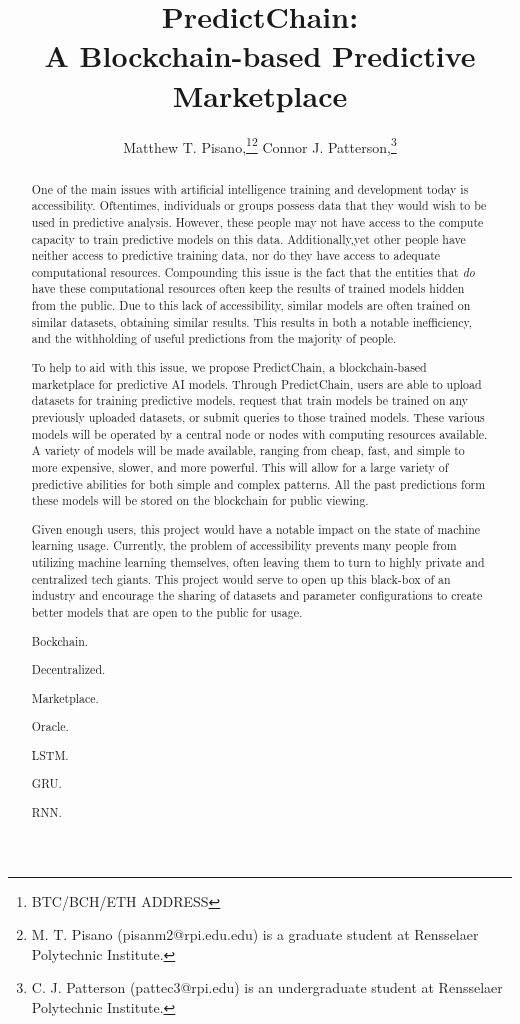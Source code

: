 \documentclass{ledger}
\title{PredictChain:\\
A Blockchain-based Predictive Marketplace}
\author{
    Matthew T. Pisano,\thanks{BTC/BCH/ETH ADDRESS}\thanks{M. T. Pisano (pisanm2@rpi.edu.edu) is a graduate
    student at Rensselaer Polytechnic Institute.} 
    Connor J. Patterson,\thanks{C. J. Patterson (pattec3@rpi.edu) is an undergraduate student at
    Rensselaer Polytechnic Institute.}
}
\begin{document}
\maketitle

\thispagestyle{pagefirst}

\begin{abstract}
One of the main issues with artificial intelligence training and development today is accessibility. Oftentimes,
individuals or groups possess data that they would wish to be used in predictive analysis. However, these people
may not have access to the compute capacity to train predictive models on this data.  Additionally,yet other
people have neither access to predictive training data, nor do they have access to adequate computational resources.
Compounding this issue is the fact that the entities that \textit{do} have these computational resources often keep the results of
trained models hidden from the public.  Due to this lack of accessibility, similar models are often trained on similar datasets,
obtaining similar results.  This results in both a notable inefficiency, and the withholding of useful predictions from
the majority of people.

To help to aid with this issue, we propose PredictChain, a blockchain-based marketplace for predictive AI models.
Through PredictChain, users are able to upload datasets for training predictive models, request that train models
be trained on any previously uploaded datasets, or submit queries to those trained models.
These various models will be operated by a central node or nodes with computing resources available. A variety of
models will be made available, ranging from cheap, fast, and simple to more expensive, slower, and more powerful.
This will allow for a large variety of predictive abilities for both simple and complex patterns.  All the past predictions
form these models will be stored on the blockchain for public viewing.

Given enough users, this project would have a notable impact on the state of machine learning usage.  Currently,
the problem of accessibility prevents many people from utilizing machine learning themselves, often leaving them to
turn to highly private and centralized tech giants.  This project would serve to open up this black-box of
an industry and encourage the sharing of datasets and parameter configurations to create better models that are open
to the public for usage.

\begin{keywords}
\item Bockchain.
\item Decentralized.
\item Marketplace.
\item Oracle.
\item LSTM.
\item GRU.
\item RNN.
\end{keywords}
\end{abstract}
\end{document}
